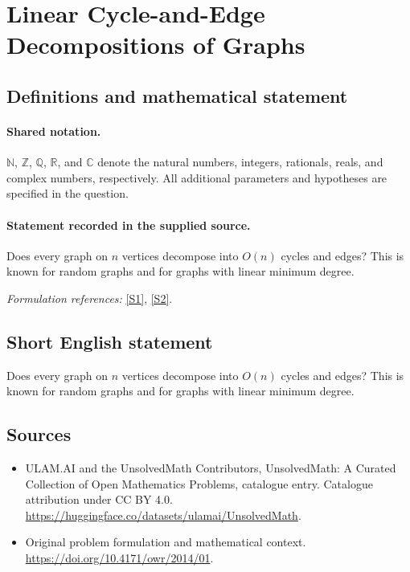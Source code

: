 \documentclass[11pt]{article}
\newcommand{\sref}[2]{\hyperlink{source:#1:#2}{[S#2]}}
\begin{document}
\section{Linear Cycle-and-Edge Decompositions of Graphs}\label{statement}

\subsection{Definitions and mathematical statement}

\paragraph{Shared notation.}$\mathbb N$, $\mathbb Z$, $\mathbb Q$, $\mathbb R$, and $\mathbb C$ denote the natural numbers, integers, rationals, reals, and complex numbers, respectively. All additional parameters and hypotheses are specified in the question.


\paragraph{Statement recorded in the supplied source.}
Does every graph on $n$ vertices decompose into $O(n)$ cycles and edges? This is known for random graphs and for graphs with linear minimum degree.
\par\smallskip\textit{Formulation references:} \sref{statement}{1}, \sref{statement}{2}.
\subsection{Short English statement}
Does every graph on $n$ vertices decompose into $O(n)$ cycles and edges? This is known for random graphs and for graphs with linear minimum degree.
\subsection{Sources}
\begin{itemize}
\item[\hypertarget{source:statement:1}{S1}] ULAM.AI and the UnsolvedMath Contributors, UnsolvedMath: A Curated Collection of Open Mathematics Problems, catalogue entry. Catalogue attribution under CC BY 4.0.
\url{https://huggingface.co/datasets/ulamai/UnsolvedMath}.
\item[\hypertarget{source:statement:2}{S2}] Original problem formulation and mathematical context.
\url{https://doi.org/10.4171/owr/2014/01}.
\end{itemize}
\label{end:statement}
\end{document}
